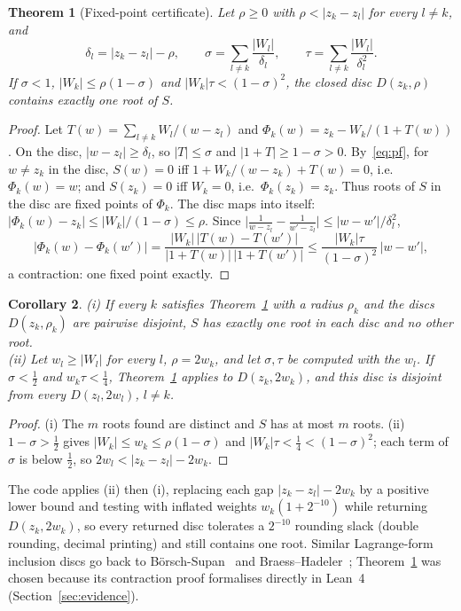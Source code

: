 \documentclass[10pt,a4paper]{article}
\newtheorem{theorem}{Theorem}[section]
\newtheorem{corollary}[theorem]{Corollary}
\theoremstyle{definition}
\numberwithin{equation}{section}
\begin{document}
\begin{theorem}[Fixed-point certificate]\label{thm:fp}
Let $\rho\ge0$ with $\rho<|z_k-z_l|$ for every $l\ne k$, and
\[
 \delta_l=|z_k-z_l|-\rho,\qquad \sigma=\sum_{l\ne k}\frac{|W_l|}{\delta_l},\qquad \tau=\sum_{l\ne k}\frac{|W_l|}{\delta_l^2}.
\]
If $\sigma<1$, $|W_k|\le\rho(1-\sigma)$ and $|W_k|\tau<(1-\sigma)^2$, the closed disc $D(z_k,\rho)$ contains exactly one root of $S$.
\end{theorem}
\begin{proof}
Let $T(w)=\sum_{l\ne k}W_l/(w-z_l)$ and $\Phi_k(w)=z_k-W_k/(1+T(w))$. On the disc, $|w-z_l|\ge\delta_l$, so $|T|\le\sigma$ and $|1+T|\ge1-\sigma>0$. By~\eqref{eq:pf}, for $w\ne z_k$ in the disc, $S(w)=0$ iff $1+W_k/(w-z_k)+T(w)=0$, i.e.\ $\Phi_k(w)=w$; and $S(z_k)=0$ iff $W_k=0$, i.e.\ $\Phi_k(z_k)=z_k$. Thus roots of $S$ in the disc are fixed points of $\Phi_k$. The disc maps into itself: $|\Phi_k(w)-z_k|\le|W_k|/(1-\sigma)\le\rho$. Since $\bigl|\frac1{w-z_l}-\frac1{w'-z_l}\bigr|\le|w-w'|/\delta_l^2$,
\[
 |\Phi_k(w)-\Phi_k(w')|=\frac{|W_k|\,|T(w)-T(w')|}{|1+T(w)|\,|1+T(w')|}
 \le\frac{|W_k|\tau}{(1-\sigma)^2}\,|w-w'|,
\]
a contraction: one fixed point exactly.
\end{proof}

\begin{corollary}\label{cor:fp}
\textup{(i)} If every $k$ satisfies Theorem~\ref{thm:fp} with a radius $\rho_k$ and the discs $D(z_k,\rho_k)$ are pairwise disjoint, $S$ has exactly one root in each disc and no other root.\\
\textup{(ii)} Let $w_l\ge|W_l|$ for every $l$, $\rho=2w_k$, and let $\sigma,\tau$ be computed with the $w_l$. If $\sigma<\frac12$ and $w_k\tau<\frac14$, Theorem~\ref{thm:fp} applies to $D(z_k,2w_k)$, and this disc is disjoint from every $D(z_l,2w_l)$, $l\ne k$.
\end{corollary}
\begin{proof}
(i) The $m$ roots found are distinct and $S$ has at most $m$ roots. (ii) $1-\sigma>\frac12$ gives $|W_k|\le w_k\le\rho(1-\sigma)$ and $|W_k|\tau<\frac14<(1-\sigma)^2$; each term of $\sigma$ is below $\frac12$, so $2w_l<|z_k-z_l|-2w_k$.
\end{proof}

The code applies (ii) then (i), replacing each gap $|z_k-z_l|-2w_k$ by a positive lower bound and testing with inflated weights $w_k(1+2^{-10})$ while returning $D(z_k,2w_k)$, so every returned disc tolerates a $2^{-10}$ rounding slack (double rounding, decimal printing) and still contains one root. Similar Lagrange-form inclusion discs go back to B\"orsch-Supan~\cite{bs} and Braess--Hadeler~\cite{bh}; Theorem~\ref{thm:fp} was chosen because its contraction proof formalises directly in Lean~4 (Section~\ref{sec:evidence}).
\end{document}

